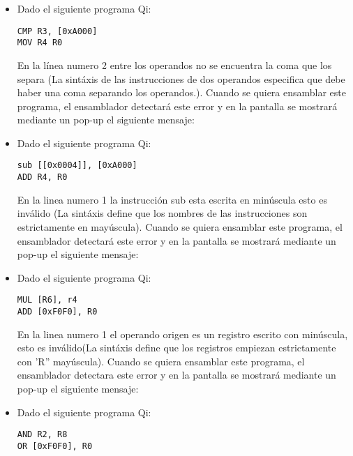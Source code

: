 \begin{itemize}

\item Dado el siguiente programa Qi:

\begin{verbatim}
CMP R3, [0xA000]
MOV R4 R0 
\end{verbatim}

En la línea numero 2 entre los operandos no se encuentra la coma que los separa (La sintáxis de las instrucciones de dos operandos especifica que debe haber una coma separando los operandos.). Cuando se quiera ensamblar este programa, el ensamblador detectará este error y en la pantalla se mostrará mediante un pop-up el siguiente mensaje:


\item Dado el siguiente programa Qi:

\begin{verbatim}
sub [[0x0004]], [0xA000]
ADD R4, R0
\end{verbatim}

En la linea numero 1 la instrucción sub esta escrita en minúscula esto es inválido (La sintáxis define que los nombres de las instrucciones son estrictamente en mayúscula). Cuando se quiera ensamblar este programa, el ensamblador detectará este error y en la pantalla se mostrará mediante un pop-up el siguiente mensaje:


\item Dado el siguiente programa Qi:

\begin{verbatim}
MUL [R6], r4
ADD [0xF0F0], R0
\end{verbatim}

En la linea numero 1 el operando origen es un registro escrito con minúscula, esto es inválido(La sintáxis define que los registros empiezan estrictamente con 'R'' mayúscula). Cuando se quiera ensamblar este programa, el ensamblador detectara este error y en la pantalla se mostrará mediante un pop-up el siguiente mensaje:


\item Dado el siguiente programa Qi:

\begin{verbatim}
AND R2, R8
OR [0xF0F0], R0
\end{verbatim}


\end{itemize}
